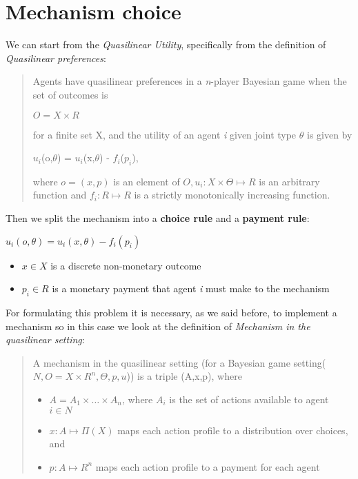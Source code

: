 \documentclass{article}
\begin{document}
\section{Mechanism choice}
\Large{
We can start from the \textit{Quasilinear Utility}, specifically from the definition of \textit{Quasilinear preferences}:
\begin{quote}
    Agents have quasilinear preferences in a \textit{n}-player Bayesian game when the set of outcomes is
    \begin{center}
        $O = X \times R$
    \end{center}
    for a finite set X, and the utility of an agent \textit{i} given joint type $\theta$ is given by
    \begin{center}
        $u_i$(o,$\theta$) = $u_i$(x,$\theta$) - $f_i$($p_i$),
    \end{center}
    where $o = (x,p)$ is an element of $O, u_i : X \times \Theta \mapsto R$ is an arbitrary function  and $f_i : R \mapsto R$ is a strictly monotonically increasing function.
\end{quote}
Then we split the mechanism into a \textbf{choice rule} and a \textbf{payment rule}:
\begin{center}
    $u_i(o,\theta) = u_i(x,\theta) - f_i(p_i)$
    \begin{itemize}
        \item $x \in X$ is a discrete non-monetary outcome
        \item $p_i \in R$ is a monetary payment that agent \textit{i} must make to the mechanism
    \end{itemize}
\end{center}
For formulating this problem it is necessary, as we said before, to implement a mechanism so in this case we look at the definition of \textit{Mechanism in the quasilinear setting}:
\begin{quote}
    A mechanism in the quasilinear setting (for a Bayesian game setting($N, O = X \times R^n, \Theta, p, u$)) is a triple (A,x,p), where
    \begin{itemize}
        \item $A = A_1 \times \dots \times A_n$, where $A_i$ is the set of actions available to agent $i \in N$
        \item $x : A \mapsto \Pi(X)$ maps each action profile to a distribution over choices, and
        \item $p : A \mapsto R^n$ maps each action profile to a payment for each agent
    \end{itemize}

\end{quote}}
\end{document}
